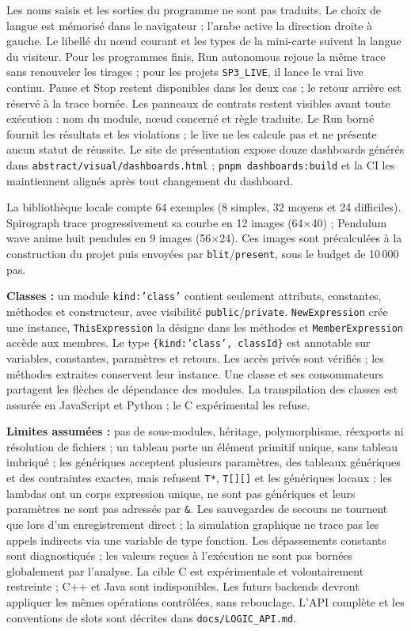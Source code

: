 \documentclass[11pt,a4paper]{article}
\newcommand{\code}[1]{\texttt{#1}}
\begin{document}
Les noms saisis et les sorties du programme ne sont pas traduits. Le choix de langue
est mémorisé dans le navigateur ; l'arabe active la direction droite à gauche. Le libellé
du nœud courant et les types de la mini-carte suivent la langue du visiteur.
Pour les programmes finis, Run autonomous rejoue la même trace sans renouveler
les tirages ; pour les projets \code{SP3\_LIVE}, il lance le vrai live continu.
Pause et Stop restent disponibles dans les deux cas ; le retour arrière est réservé
à la trace bornée. Les panneaux de contrats restent visibles avant toute exécution :
nom du module, nœud concerné et règle traduite. Le Run borné fournit les résultats
et les violations ; le live ne les calcule pas et ne présente aucun statut de réussite.
Le site de présentation expose douze dashboards générés dans \code{abstract/visual/dashboards.html} ;
\code{pnpm dashboards:build} et la CI les maintiennent alignés après tout changement du dashboard.

La bibliothèque locale compte 64 exemples (8 simples, 32 moyens et 24 difficiles).
Spirograph trace progressivement sa courbe en 12 images (64×40) ; Pendulum wave
anime huit pendules en 9 images (56×24). Ces images sont précalculées à la construction
du projet puis envoyées par \code{blit}/\code{present}, sous le budget de 10\,000 pas.

\textbf{Classes :} un module \code{kind:'class'} contient seulement attributs,
constantes, méthodes et constructeur, avec visibilité \code{public}/\code{private}.
\code{NewExpression} crée une instance, \code{ThisExpression} la désigne dans les
méthodes et \code{MemberExpression} accède aux membres. Le type
\code{\{kind:'class', classId\}} est annotable sur variables, constantes,
paramètres et retours. Les accès privés sont vérifiés ; les méthodes extraites
conservent leur instance. Une classe et ses consommateurs partagent les flèches
de dépendance des modules. La transpilation des classes est assurée en JavaScript et Python ; le C expérimental les refuse.

\textbf{Limites assumées :} pas de sous-modules, héritage, polymorphisme, réexports ni
résolution de fichiers ; un tableau porte un élément primitif unique, sans
tableau imbriqué ; les génériques acceptent plusieurs paramètres, des tableaux
génériques et des contraintes exactes, mais refusent \code{T*}, \code{T[][]} et
les génériques locaux ; les lambdas ont un corps expression unique, ne sont pas
génériques et leurs paramètres ne sont pas adressés par \code{\&}. Les
sauvegardes de secours ne tournent que lors d'un enregistrement direct ; la
simulation graphique ne trace pas les appels indirects via une variable de type
fonction. Les dépassements constants sont diagnostiqués ; les valeurs reçues à
l'exécution ne sont pas bornées globalement par l'analyse. La cible C est expérimentale et volontairement restreinte ; C++ et Java sont indisponibles. Les futurs backends devront appliquer les
mêmes opérations contrôlées, sans rebouclage. L'API complète et les conventions
de slots sont décrites dans \code{docs/LOGIC\_API.md}.
\end{document}
